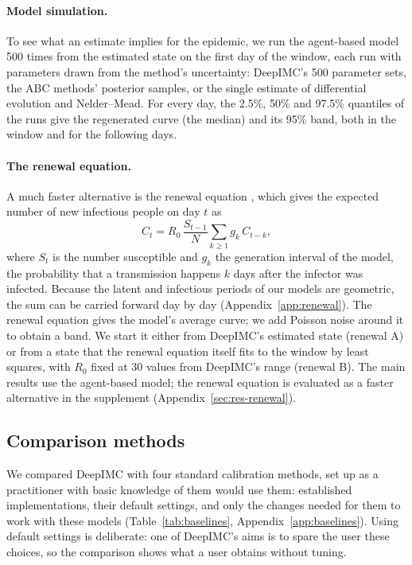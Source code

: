 \documentclass[12pt]{article}
\begin{document}
\paragraph{Model simulation.} To see what an estimate implies for the epidemic, we run the agent-based
model 500 times from the estimated state on the first day of the window, each run with parameters drawn
from the method's uncertainty: DeepIMC's 500 parameter sets, the ABC methods' posterior samples, or
the single estimate of differential evolution and Nelder--Mead. For every day, the 2.5\%, 50\% and
97.5\% quantiles of the runs give the regenerated curve (the median) and its 95\% band, both in the
window and for the following days.

\paragraph{The renewal equation.} A much faster alternative is the renewal equation
\autocite{fraser2007estimating,wallinga2007generation}, which gives the expected number of new
infectious people on day $t$ as
\begin{equation}\label{eq:renewal}
C_t = R_0\,\frac{S_{t-1}}{N}\sum_{k\ge 1} g_k\, C_{t-k},
\end{equation}
where $S_t$ is the number susceptible and $g_k$ the generation interval of the model, the probability
that a transmission happens $k$ days after the infector was infected. Because the latent and
infectious periods of our models are geometric, the sum can be carried forward day by day
(Appendix~\ref{app:renewal}). The renewal equation gives the model's average curve; we add Poisson
noise around it to obtain a band. We start it either from DeepIMC's estimated state (renewal A) or
from a state that the renewal equation itself fits to the window by least squares, with $R_0$ fixed
at 30 values from DeepIMC's range (renewal B). The main results use the agent-based model; the renewal equation is
evaluated as a faster alternative in the supplement (Appendix~\ref{sec:res-renewal}).

\subsection{Comparison methods}\label{sec:baselines}

We compared DeepIMC with four standard calibration methods, set up as a practitioner with basic
knowledge of them would use them: established implementations, their default settings, and only
the changes needed for them to work with these models (Table~\ref{tab:baselines},
Appendix~\ref{app:baselines}). Using default settings is deliberate: one of DeepIMC's aims is to
spare the user these choices, so the comparison shows what a user obtains without tuning.
\end{document}
